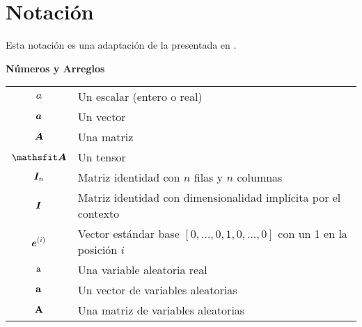 \chapter*{Notación}
\label{cha:notation}



\vspace{\notationgap}
{\begin{center} \large Esta notación es una adaptación de la presentada en \cite{deeplearning}.\end{center}}

\begin{minipage}{\textwidth}
  
\centerline{\bf Números y Arreglos}
\bgroup
\def\arraystretch{1.5}
\begin{tabular}{cp{}}
$\displaystyle a$ & Un escalar (entero o real)\\
$\displaystyle {\bm{a}}$ & Un vector\\
$\displaystyle {\bm{A}}$ & Una matriz\\
$\displaystyle \tA$ & Un tensor\\
$\displaystyle {\bm{I}}_n$ & Matriz identidad con $n$ filas y $n$ columnas\\
$\displaystyle {\bm{I}}$ & Matriz identidad con dimensionalidad implícita por el contexto\\
$\displaystyle {\bm{e}}^{(i)}$ & Vector estándar base $[0,\dots,0,1,0,\dots,0]$ con un 1 en la posición $i$\\
$\displaystyle {\textnormal{a}}$ & Una variable aleatoria real\\
$\displaystyle {\mathbf{a}}$ & Un vector de variables aleatorias\\
$\displaystyle {\mathbf{A}}$ & Una matriz de variables aleatorias\\
\end{tabular}
\egroup
{}
\end{minipage}


